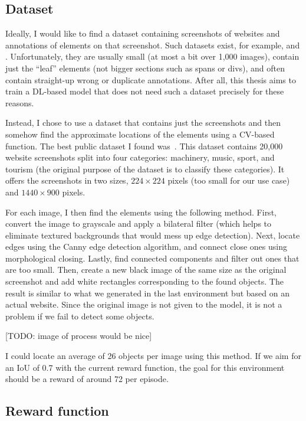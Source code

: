 \documentclass[
  digital,     %
  oneside,     %
  nosansbold,  %
  nocolorbold, %
  lof,         %
  lot,         %
]{fithesis4}
\begin{document}
\subsection{Dataset}

Ideally, I would like to find a dataset containing screenshots of websites and annotations of elements on that screenshot. Such datasets exist, for example, \cite{roboflow-dataset-1} and \cite{roboflow-dataset-2}. Unfortunately, they are usually small (at most a bit over 1,000 images), contain just the \enquote{leaf} elements (not bigger sections such as spans or divs), and often contain straight-up wrong or duplicate annotations. After all, this thesis aims to train a DL-based model that does not need such a dataset precisely for these reasons.

Instead, I chose to use a dataset that contains just the screenshots and then somehow find the approximate locations of the elements using a CV-based function. The best public dataset I found was~\cite{aydos2020}. This dataset contains 20,000 website screenshots split into four categories: machinery, music, sport, and tourism (the original purpose of the dataset is to classify these categories). It offers the screenshots in two sizes, $224\times224$ pixels (too small for our use case) and $1440\times900$ pixels.

For each image, I then find the elements using the following method. First, convert the image to grayscale and apply a bilateral filter (which helps to eliminate textured backgrounds that would mess up edge detection). Next, locate edges using the Canny edge detection algorithm, and connect close ones using morphological closing. Lastly, find connected components and filter out ones that are too small. Then, create a new black image of the same size as the original screenshot and add white rectangles corresponding to the found objects. The result is similar to what we generated in the last environment but based on an actual website. Since the original image is not given to the model, it is not a problem if we fail to detect some objects.

[TODO: image of process would be nice]

I could locate an average of 26 objects per image using this method. If we aim for an IoU of 0.7 with the current reward function, the goal for this environment should be a reward of around 72 per episode.

\subsection{Reward function}
\end{document}
